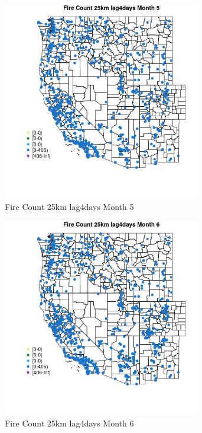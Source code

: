 \begin{figure} 
\centering  
\includegraphics[width=0.77\textwidth]{Code_Outputs/Report_ML_input_PM25_Step4_part_f_de_duplicated_aves_prioritize_24hr_obswNAs_MapObsMo5Fire_Count_25km_lag4days.jpg} 
\caption{\label{fig:Report_ML_input_PM25_Step4_part_f_de_duplicated_aves_prioritize_24hr_obswNAsMapObsMo5Fire_Count_25km_lag4days}Fire Count 25km lag4days Month 5} 
\end{figure} 
 

\clearpage 

\begin{figure} 
\centering  
\includegraphics[width=0.77\textwidth]{Code_Outputs/Report_ML_input_PM25_Step4_part_f_de_duplicated_aves_prioritize_24hr_obswNAs_MapObsMo6Fire_Count_25km_lag4days.jpg} 
\caption{\label{fig:Report_ML_input_PM25_Step4_part_f_de_duplicated_aves_prioritize_24hr_obswNAsMapObsMo6Fire_Count_25km_lag4days}Fire Count 25km lag4days Month 6} 
\end{figure} 
 

